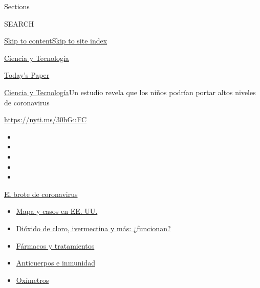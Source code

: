 Sections

SEARCH

\protect\hyperlink{site-content}{Skip to
content}\protect\hyperlink{site-index}{Skip to site index}

\href{https://www.nytimes.com/es/section/ciencia-y-tecnologia}{Ciencia y
Tecnología}

\href{https://myaccount.nytimes.com/auth/login?response_type=cookie\&client_id=vi}{}

\href{https://www.nytimes.com/section/todayspaper}{Today's Paper}

\href{/es/section/ciencia-y-tecnologia}{Ciencia y
Tecnología}\textbar{}Un estudio revela que los niños podrían portar
altos niveles de coronavirus

\url{https://nyti.ms/30hGuFC}

\begin{itemize}
\item
\item
\item
\item
\item
\end{itemize}

\href{https://www.nytimes.com/es/spotlight/coronavirus?action=click\&pgtype=Article\&state=default\&region=TOP_BANNER\&context=storylines_menu}{El
brote de coronavirus}

\begin{itemize}
\tightlist
\item
  \href{https://www.nytimes.com/es/interactive/2020/espanol/mundo/coronavirus-en-estados-unidos.html?action=click\&pgtype=Article\&state=default\&region=TOP_BANNER\&context=storylines_menu}{Mapa
  y casos en EE. UU.}
\item
  \href{https://www.nytimes.com/es/2020/07/23/espanol/america-latina/bolivia-cloro-coronavirus-ivermectina.html?action=click\&pgtype=Article\&state=default\&region=TOP_BANNER\&context=storylines_menu}{Dióxido
  de cloro, ivermectina y más: ¿funcionan?}
\item
  \href{https://www.nytimes.com/es/interactive/2020/science/coronavirus-tratamientos-curas.html?action=click\&pgtype=Article\&state=default\&region=TOP_BANNER\&context=storylines_menu}{Fármacos
  y tratamientos}
\item
  \href{https://www.nytimes.com/es/2020/07/28/espanol/ciencia-y-tecnologia/anticuerpos-coronavirus-inmunidad.html?action=click\&pgtype=Article\&state=default\&region=TOP_BANNER\&context=storylines_menu}{Anticuerpos
  e inmunidad}
\item
  \href{https://www.nytimes.com/es/2020/04/29/espanol/estilos-de-vida/oximetro-para-que-sirve.html?action=click\&pgtype=Article\&state=default\&region=TOP_BANNER\&context=storylines_menu}{Oxímetros}
\end{itemize}

